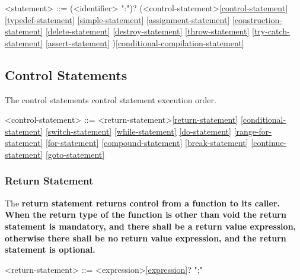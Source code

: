 \documentclass[a4paper,oneside,11pt]{article}
\begin{document}
\begin{grammar}
\label{statement}<statement> ::= (<identifier> ":")? (<control-statement>\ref{control-statement}
\ref{typedef-statement}
\ref{simple-statement}
\ref{assignment-statement}
\ref{construction-statement}
\ref{delete-statement}
\ref{destroy-statement}
\ref{throw-statement}
\ref{try-catch-statement}
\ref{assert-statement}
)\ref{conditional-compilation-statement}
\end{grammar}

\subsection{Control Statements}

The control statements control statement execution order.

\begin{grammar}
\label{control-statement}<control-statement> ::= <return-statement>\ref{return-statement}
\ref{conditional-statement}
\ref{switch-statement}
\ref{while-statement}
\ref{do-statement}
\ref{range-for-statement}
\ref{for-statement}
\ref{compound-statement}
\ref{break-statement}
\ref{continue-statement}
\ref{goto-statement}
\end{grammar}

\subsubsection{Return Statement}

The \bf{return} statement returns control from a function to its caller.
When the return type of the function is other than \bf{void}
the return statement is mandatory, and
there shall be a return value expression,
otherwise there shall be no return value expression,
and the return statement is optional.

\begin{grammar}
\label{return-statement}<return-statement> ::=  <expression>\ref{expression}? ";"
\end{grammar}
\end{document}
